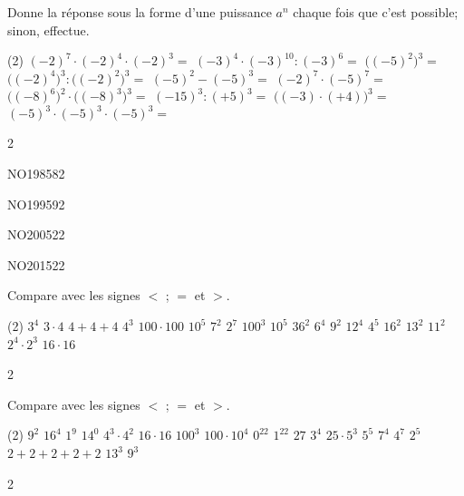 \documentclass[a4paper,11pt]{report}
\begin{document}
\begin{exop}{%
Donne la réponse sous la forme d'une puissance $a^n$ chaque fois que c'est possible; sinon, effectue.
\begin{tasks}(2)
    \task $(-2)^7\cdot(-2)^4\cdot(-2)^3=$
    \task $(-3)^4\cdot(-3)^{10}:(-3)^6=$
    \task $\big((-5)^2\big)^3=$
    \task $\big((-2)^4\big)^3:\big((-2)^2\big)^3=$
    \task $(-5)^2-(-5)^3=$
    \task $(-2)^7\cdot(-5)^7=$
    \task $\big((-8)^6\big)^2\cdot\big((-8)^3\big)^3=$
    \task $(-15)^3:(+5)^3=$
    \task $\big((-3)\cdot(+4)\big)^3=$
    \task $(-5)^3\cdot(-5)^3\cdot(-5)^3=$
\end{tasks}
}{2}    
\end{exop}

\begin{exof}{NO198}{58}{2} %
\end{exof}
\begin{exof}{NO199}{59}{2} %
\end{exof}
\begin{exol}{NO200}{52}{2} %
\end{exol}
\begin{exol}{NO201}{52}{2} %
\end{exol}

\begin{exop}{%
Compare avec les signes $<$ ; $=$ et $>$.
\begin{tasks}(2)
    \task $3^4$  $3\cdot4$
    \task $4+4+4$  $4^3$
    \task $100\cdot100$  $10^5$
    \task $7^2$  $2^7$
    \task $100^3$  $10^5$
    \task $36^2$  $6^4$
    \task $9^2$  $12^4$
    \task $4^5$  $16^2$
    \task $13^2$  $11^2$
    \task $2^4\cdot2^3$  $16\cdot16$
\end{tasks}
}{2}    
\end{exop}

\begin{exop}{%
Compare avec les signes $<$ ; $=$ et $>$.
\begin{tasks}(2)
    \task $9^2$  $16^4$
    \task $1^9$  $14^0$
    \task $4^3\cdot4^2$  $16\cdot16$
    \task $100^3$  $100\cdot10^4$
    \task $0^{22}$  $1^{22}$
    \task $27$  $3^4$
    \task $25\cdot5^3$  $5^5$
    \task $7^4$  $4^7$
    \task $2^5$  $2+2+2+2+2$
    \task $13^3$  $9^3$
\end{tasks}
}{2}    
\end{exop}
\end{document}

